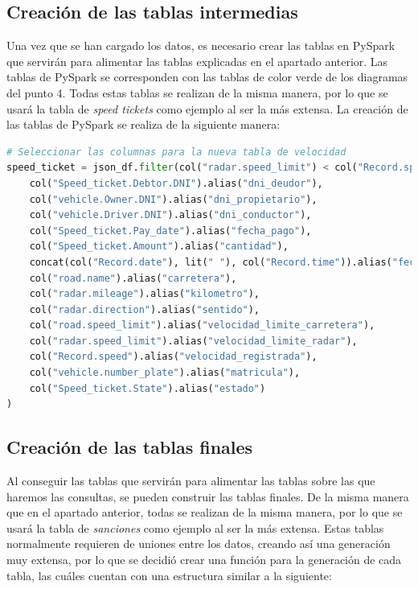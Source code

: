 \documentclass[]{article}
\begin{document}
\subsection{Creación de las tablas intermedias}
Una vez que se han cargado los datos, es necesario crear las tablas en PySpark que servirán para alimentar las tablas explicadas en el apartado anterior. Las tablas de PySpark se corresponden con las tablas de color verde de los diagramas del punto 4. Todas estas tablas se realizan de la misma manera, por lo que se usará la tabla de \textit{speed tickets} como ejemplo al ser la más extensa. La creación de las tablas de PySpark se realiza de la siguiente manera:

\begin{lstlisting}[language=python, caption=Carga de datos en PySpark]
# Seleccionar las columnas para la nueva tabla de velocidad
speed_ticket = json_df.filter(col("radar.speed_limit") < col("Record.speed")).select(
    col("Speed_ticket.Debtor.DNI").alias("dni_deudor"),
    col("vehicle.Owner.DNI").alias("dni_propietario"),
    col("vehicle.Driver.DNI").alias("dni_conductor"),
    col("Speed_ticket.Pay_date").alias("fecha_pago"),
    col("Speed_ticket.Amount").alias("cantidad"),
    concat(col("Record.date"), lit(" "), col("Record.time")).alias("fecha_grabacion"),
    col("road.name").alias("carretera"),
    col("radar.mileage").alias("kilometro"),
    col("radar.direction").alias("sentido"),
    col("road.speed_limit").alias("velocidad_limite_carretera"),
    col("radar.speed_limit").alias("velocidad_limite_radar"),
    col("Record.speed").alias("velocidad_registrada"),
    col("vehicle.number_plate").alias("matricula"),
    col("Speed_ticket.State").alias("estado")
)
\end{lstlisting}

\subsection{Creación de las tablas finales}
Al conseguir las tablas que servirán para alimentar las tablas sobre las que haremos las consultas, se pueden construir las tablas finales. De la misma manera que en el apartado anterior, todas se realizan de la misma manera, por lo que se usará la tabla de \textit{sanciones} como ejemplo al ser la más extensa. Estas tablas normalmente requieren de uniones entre los datos, creando así una generación muy extensa, por lo que se decidió crear una función para la generación de cada tabla, las cuáles cuentan con una estructura similar a la siguiente:
\end{document}
